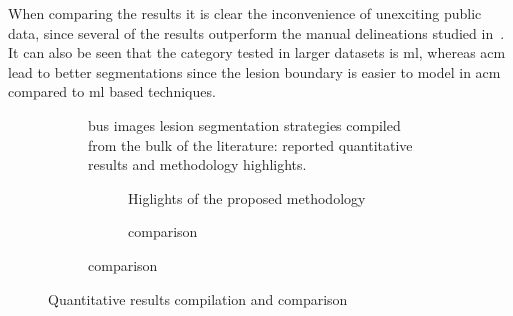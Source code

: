 When comparing the results it is clear the inconvenience of unexciting public data, since several of the results outperform the manual delineations studied in~\cite{gerard2013}.
It can also be seen that the category tested in larger datasets is \ac{ml}, whereas \ac{acm} lead to better segmentations since the lesion boundary is easier to model in \ac{acm} compared to \ac{ml} based techniques.

\begin{figure}[h]
  \begin{subfigure}[b]{\textwidth}
    {\tiny }
    \caption{\ac{bus} images lesion segmentation strategies compiled from the bulk of the literature: reported quantitative results and methodology highlights.}
    \label{fig:surveyResults:survey}
  \end{subfigure}
  \begin{subfigure}[b]{\textwidth}
    \centering
    \begin{subfigure}[b]{0.45\textwidth}
      {\footnotesize }
      \caption{Higlights of the proposed methodology}
      \label{fig:surveyResults:method}
    \end{subfigure}
    \begin{subfigure}[b]{0.45\textwidth}
      {\tiny  }
      \caption{{\small comparison}}
      \label{fig:surveyResults:comparison}
    \end{subfigure}
  \end{subfigure}
  \hfill
  \caption{Quantitative results compilation and comparison}
  \label{fig:surveyResults}
\end{figure}


